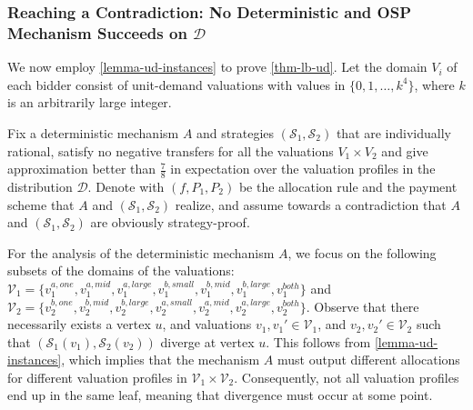 \subsubsection[Reaching a Contradiction: No Deterministic and OSP Mechanism Succeeds on D]{Reaching a Contradiction: No Deterministic and OSP Mechanism Succeeds on $\mathcal D$}
\label{subsubsec-contradiction-ud}
We now employ \cref{lemma-ud-instances} to prove  \cref{thm-lb-ud}. Let the domain $V_i$ of each bidder consist 
of unit-demand valuations with values in  $\{0,1,\ldots,k^4\}$, where $k$ is an arbitrarily large integer. 


Fix a deterministic mechanism $A$ and strategies
$(\mathcal S_1,\mathcal S_2)$ that are individually rational, satisfy no negative transfers for all the valuations  $V_1\times V_2$ and give approximation better than $\frac{7}{8}$
in expectation over the valuation profiles in the distribution $\mathcal D$. 
Denote with  $(f,P_1,P_2)$ be the allocation rule and the payment scheme that $A$ and $(\mathcal S_1,\mathcal S_2)$ realize, and assume towards a contradiction that $A$ and $(\mathcal S_1,\mathcal S_2)$ are obviously strategy-proof. 


For the analysis of the deterministic mechanism $A$, we focus on the following subsets of the domains of the valuations:
$
\mathcal{V}_1=\{v_1^{a,one},v_1^{a,mid},v_1^{a,large},v_1^{b,small},v_1^{b,mid},v_1^{b,large},v_1^{both}\}$ and  $\mathcal V_2=\{v_2^{b,one},v_2^{b,mid},v_2^{b,large},\allowbreak v_2^{a,small},v_2^{a,mid}, \allowbreak v_2^{a,large},v_2^{both}\}$.
Observe that there necessarily exists a vertex $u$, and valuations $v_1,v_1' \in \mathcal{V}_1$, and  $v_2,v_2' \in \mathcal{V}_2$ such that $(\mathcal{S}_1(v_1), \mathcal{S}_2(v_2))$ diverge at vertex $u$. This follows from \cref{lemma-ud-instances}, which implies that the mechanism $A$ must output different allocations for different valuation profiles in $\mathcal{V}_1 \times \mathcal{V}_2$. Consequently, not all valuation profiles end up in the same leaf, meaning that divergence must occur at some point.

